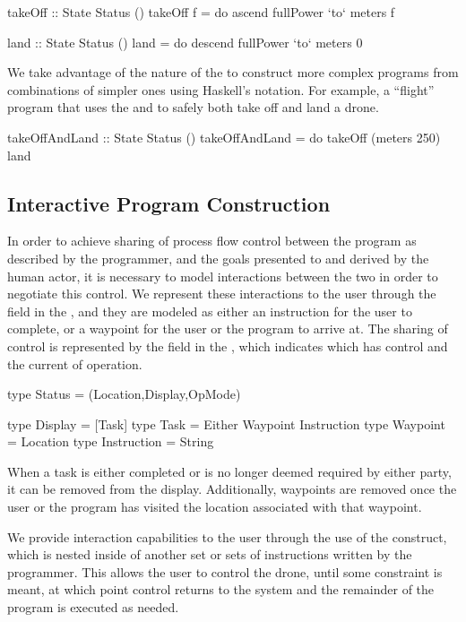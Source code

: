 \documentclass[11pt]{article}
\begin{document}
\begin{program}
takeOff :: State Status ()
takeOff f = do ascend fullPower `to` meters f
\end{program}

\begin{program}
land :: State Status ()
land = do descend fullPower `to` meters 0
\end{program}

We take advantage of the nature of the  to construct more
complex programs from combinations of simpler ones using Haskell's 
notation. For example, a ``flight'' program that uses the  and
 to safely both take off and land a drone.

\begin{program}
takeOffAndLand :: State Status ()
takeOffAndLand = do takeOff (meters 250)
                    land
\end{program}

\subsection{Interactive Program Construction}
\label{sec:examples:interactive}
In order to achieve sharing of process flow control between the program as
described by the programmer, and the goals presented to and derived by the
human actor, it is necessary to model interactions between the two in order to
negotiate this control. We represent these interactions to the user through
the  field in the , and they are modeled as
either an instruction for the user to complete, or a waypoint for the user or
the program to arrive at. The sharing of control is represented by the
 field in the , which indicates which 
has control and the current  of operation.

\begin{program}
type Status = (Location,Display,OpMode)

type Display = [Task]
type Task = Either Waypoint Instruction
type Waypoint = Location
type Instruction = String
\end{program}

When a task is either completed or is no longer deemed required by either
party, it can be removed from the display. Additionally, waypoints are removed
once the user or the program has visited the location associated with that
waypoint.

We provide interaction capabilities to the user through the use of the
 construct, which is nested inside of another set or sets of
instructions written by the programmer. This allows the user to control the
drone, until some constraint is meant, at which point control returns to the
system and the remainder of the program is executed as needed.
\end{document}
